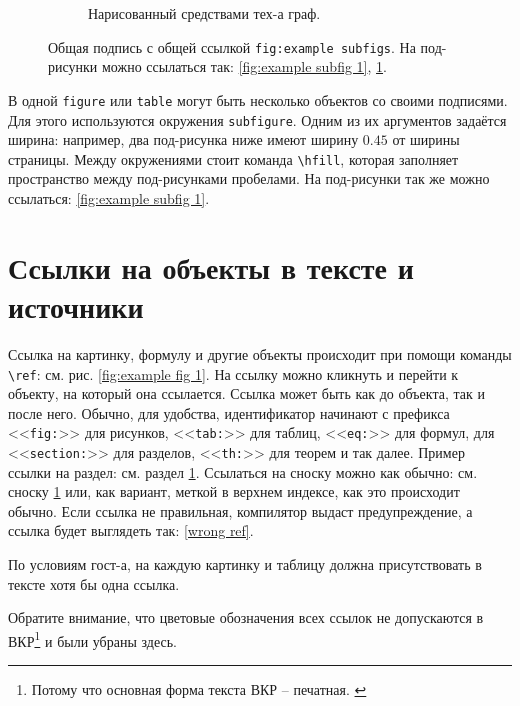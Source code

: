 \documentclass[a4paper, 14pt]{extreport}
\begin{document}
\begin{figure}[h]
\begin{subfigure}[t]{0.45\textwidth}
{
        }
        \caption{Нарисованный средствами тех-а граф.}
        \label{fig:example subfig 2}
    \end{subfigure}
    \caption{Общая подпись с общей ссылкой \texttt{fig:example subfigs}. На под-рисунки можно ссылаться так: \ref{fig:example subfig 1}, \ref{fig:example subfig 2}.}
    \label{fig:example subfigs}
\end{figure}

В одной \verb!figure! или \verb!table! могут быть несколько объектов со своими подписями. Для этого используются окружения \verb!subfigure!. Одним из их аргументов задаётся ширина: например, два под-рисунка ниже имеют ширину $0.45$ от ширины страницы. Между окружениями стоит команда \verb!\hfill!, которая заполняет пространство между под-рисунками пробелами. На под-рисунки так же можно ссылаться: \ref{fig:example subfig 1}.




\section{Ссылки на объекты в тексте и источники}\label{section:references}

Ссылка на картинку, формулу и другие объекты происходит при помощи команды  \verb!\ref!: см. рис. \ref{fig:example fig 1}. На ссылку можно кликнуть и перейти к объекту, на который она ссылается. Ссылка может быть как до объекта, так и после него. Обычно, для удобства, идентификатор начинают с префикса <<\verb!fig:!>> для рисунков, <<\verb!tab:!>> для таблиц, <<\verb!eq:!>> для формул, для <<\verb!section:!>> для разделов, <<\verb!th:!>> для теорем и так далее. Пример ссылки на раздел: см. раздел \ref{section:references}. Ссылаться на сноску можно как обычно: см. сноску \ref{footnote:example} или, как вариант, меткой в верхнем индексе, как это происходит обычно. Если ссылка не правильная, компилятор выдаст предупреждение, а ссылка будет выглядеть так: \ref{wrong ref}.

По условиям гост-а, на каждую картинку и таблицу должна присутствовать в тексте хотя бы одна ссылка.

Обратите внимание, что цветовые обозначения всех ссылок не допускаются в ВКР\footnote{Потому что основная форма текста ВКР -- печатная. \label{footnote:example}} и были убраны здесь.
\end{document}

